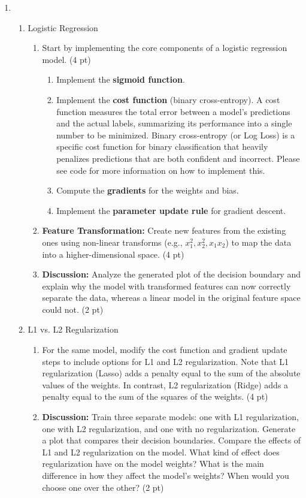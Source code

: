 \documentclass{article}
\theoremstyle{definition}
\theoremstyle{remark}
\newenvironment{Q}
        {%
          \clearpage
          \item
        }
        {%
          \phantom{s} %
          \bigskip
        }
\begin{document}
\begin{enumerate}[font={\Large\bfseries},left=0pt]
\begin{Q}
\begin{enumerate}
\item{Logistic Regression
\begin{enumerate}
    \item Start by implementing the core components of a logistic regression model. (4 pt)
    \begin{enumerate}
        \item Implement the \textbf{sigmoid function}.
        \item Implement the \textbf{cost function} (binary cross-entropy).  A cost function measures the total error between a model's predictions and the actual labels, summarizing its performance into a single number to be minimized. Binary cross-entropy (or Log Loss) is a specific cost function for binary classification that heavily penalizes predictions that are both confident and incorrect. Please see code for more information on how to implement this.
        \item Compute the \textbf{gradients} for the weights and bias.
        \item Implement the \textbf{parameter update rule} for gradient descent.
    \end{enumerate}
    \item \textbf{Feature Transformation:} Create new features from the existing ones using non-linear transforms (e.g., $x_1^2, x_2^2, x_1x_2$) to map the data into a higher-dimensional space. (4 pt)
    \item \textbf{Discussion:} Analyze the generated plot of the decision boundary and explain why the model with transformed features can now correctly separate the data, whereas a linear model in the original feature space could not. (2 pt)
\end{enumerate}
}
\item{L1 vs. L2 Regularization 
\begin{enumerate}
    \item For the same model, modify the cost function and gradient update steps to include options for L1 and L2 regularization. Note that L1 regularization (Lasso) adds a penalty equal to the sum of the absolute values of the weights. In contrast, L2 regularization (Ridge) adds a penalty equal to the sum of the squares of the weights. (4 pt)
    \item \textbf{Discussion:} Train three separate models: one with L1 regularization, one with L2 regularization, and one with no regularization. Generate a plot that compares their decision boundaries. Compare the effects of L1 and L2 regularization on the model. What kind of effect does regularization have on the model weights? What is the main difference in how they affect the model's weights? When would you choose one over the other? (2 pt)

\end{enumerate}}
\end{enumerate}
\end{Q}
\end{enumerate}
\end{document}
